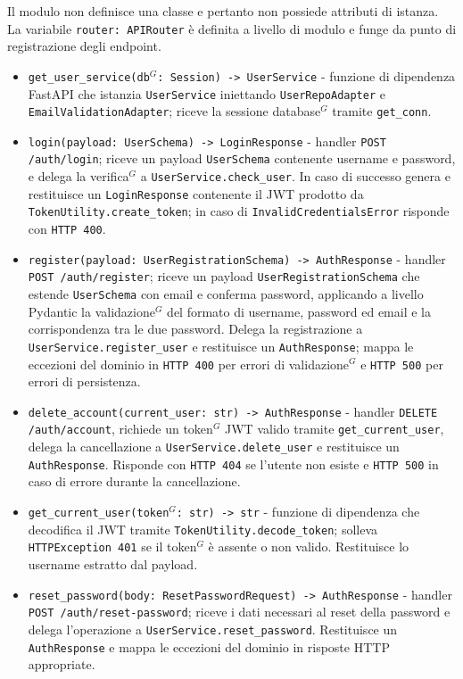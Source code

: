 Il modulo non definisce una classe e pertanto non possiede attributi di istanza.\\
La variabile \texttt{router: APIRouter} è definita a livello di modulo e funge da  punto di registrazione degli endpoint.
\begin{itemize}
	\item \texttt{get\_user\_service(db$^G$: Session) -> UserService} - funzione di dipendenza FastAPI che istanzia \texttt{UserService} iniettando \texttt{UserRepoAdapter} e \texttt{EmailValidationAdapter}; riceve la sessione database$^G$ tramite \texttt{get\_conn}.
	\item \texttt{login(payload: UserSchema) -> LoginResponse} - handler \newline \texttt{POST /auth/login}; riceve un payload \texttt{UserSchema} contenente username e password, e delega la verifica$^G$ a \texttt{UserService.check\_user}. In caso di successo genera e restituisce un \texttt{LoginResponse} contenente il JWT prodotto da \texttt{TokenUtility.create\_token}; in caso di \texttt{InvalidCredentialsError} risponde con \texttt{HTTP 400}.
	\item \texttt{register(payload: UserRegistrationSchema) -> AuthResponse} - \newline handler \texttt{POST /auth/register}; riceve un payload \texttt{UserRegistrationSchema} che estende \texttt{UserSchema} con email e conferma password, applicando a livello Pydantic la validazione$^G$ del formato di username, password ed email e la corrispondenza tra le due password. Delega la registrazione a \newline \texttt{UserService.register\_user} e restituisce un \texttt{AuthResponse}; mappa le eccezioni del dominio in \texttt{HTTP 400} per errori di validazione$^G$ e \texttt{HTTP 500} per errori di persistenza.
	\item \texttt{delete\_account(current\_user: str) -> AuthResponse} - handler \texttt{DELETE /auth/account}, richiede un token$^G$ JWT valido tramite \texttt{get\_current\_user}, delega la cancellazione a \texttt{UserService.delete\_user} e restituisce un \newline \texttt{AuthResponse}. Risponde con \texttt{HTTP 404} se l'utente non esiste e \texttt{HTTP 500} in caso di errore durante la cancellazione.
	\item \texttt{get\_current\_user(token$^G$: str) -> str} - funzione di dipendenza che decodifica il JWT tramite \texttt{TokenUtility.decode\_token}; solleva \newline \texttt{HTTPException 401} se il token$^G$ è assente o non valido. Restituisce lo username estratto dal payload.
	\item \texttt{reset\_password(body: ResetPasswordRequest) -> AuthResponse} - handler \texttt{POST /auth/reset-password}; riceve i dati necessari al reset della password e delega l'operazione a \texttt{UserService.reset\_password}. Restituisce un \texttt{AuthResponse} e mappa le eccezioni del dominio in risposte HTTP appropriate.
\end{itemize}

